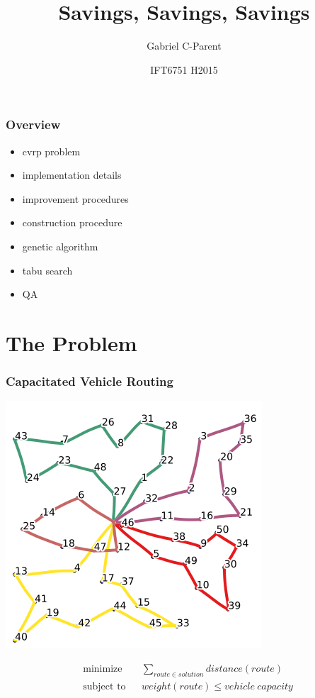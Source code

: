 \documentclass{beamer}
\title{Savings, Savings, Savings}
\author{Gabriel C-Parent}
\date{IFT6751 H2015}
\begin{document}
\maketitle

\begin{frame}
\frametitle{Overview}
\begin{itemize}
	\item cvrp problem
	\item implementation details
	\item improvement procedures
	\item construction procedure
	\item genetic algorithm
	\item tabu search
	\item QA
\end{itemize}
\end{frame}


\section{The Problem}

\begin{frame}
\frametitle{Capacitated Vehicle Routing}
\begin{center}

\includegraphics[scale=0.25]{figs/cvrp}


\begin{equation*}
\begin{aligned}
& \text{minimize}
& & \sum\limits_{route \in solution} distance(route) \\
& \text{subject to}
& & weight(route) \leq vehicle\ capacity
\end{aligned}
\end{equation*}

\end{center}
\end{frame}
\end{document}
